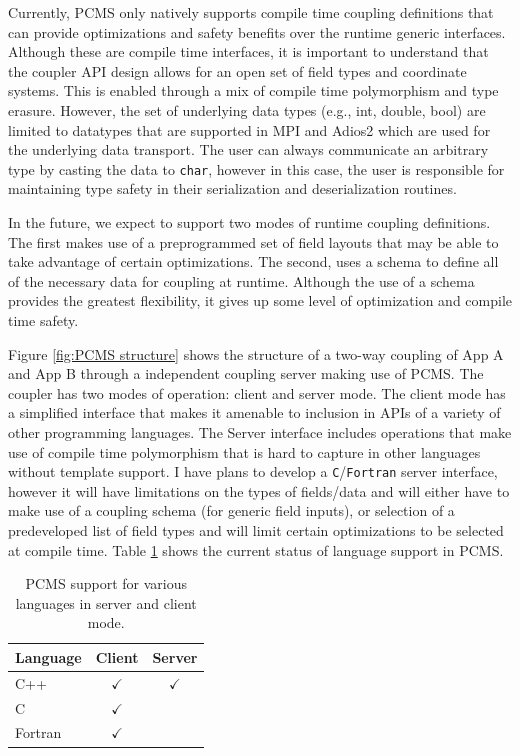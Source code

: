 \documentclass[12pt]{article}
\begin{document}
Currently, PCMS only natively supports compile time coupling definitions that can provide optimizations and safety benefits over the runtime generic interfaces. Although these are compile time interfaces, it is important to understand that the coupler API design allows for an open set of field types and coordinate systems. This is enabled through a mix of compile time polymorphism and type erasure. However, the set of underlying data types (e.g., int, double, bool) are limited to datatypes that are supported in MPI and Adios2 which are used for the underlying data transport. The user can always communicate an arbitrary type by casting the data to \texttt{char}, however in this case, the user is responsible for maintaining type safety in their serialization and deserialization routines.

In the future, we expect to support two modes of runtime coupling definitions. The first makes use of a preprogrammed set of field layouts that may be able to take advantage of certain optimizations. The second, uses a schema to define all of the necessary data for coupling at runtime. Although the use of a schema provides the greatest flexibility, it gives up some level of optimization and compile time safety.

Figure \ref{fig:PCMS structure} shows the structure of a two-way coupling of App A and App B through a independent coupling server making use of PCMS. The coupler has two modes of operation: client and server mode. The client mode has a simplified interface that makes it amenable to inclusion in APIs of a variety of other programming languages. The Server interface includes operations that make use of compile time polymorphism that is hard to capture in other languages without template support. I have plans to develop a \texttt{C}/\texttt{Fortran} server interface, however it will have limitations on the types of fields/data and will either have to make use of a coupling schema (for generic field inputs), or selection of a predeveloped list of field types and will limit certain optimizations to be selected at compile time. Table \ref{tab:language support} shows the current status of language support in PCMS.

\begin{table}[]
    \centering
    \begin{tabular}{|l|c|c|}
        \hline
        Language & Client & Server \\ \hline
        C++ & \(\checkmark\) & \(\checkmark\) \\ \hline
        C & \(\checkmark\) & \\ \hline
        Fortran & \(\checkmark\) & \\ \hline
    \end{tabular}
    \caption{PCMS support for various languages in server and client mode.}
    \label{tab:language support}
\end{table}
\end{document}
